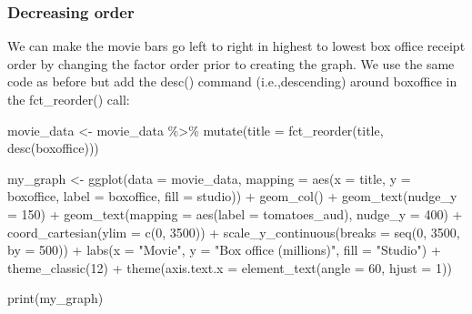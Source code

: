 \documentclass[
]{krantz}
\makeatletter
\newenvironment{Shaded}{\begin{snugshade}}{\end{snugshade}}
\newcommand{\AttributeTok}[1]{\textcolor[rgb]{0.61,0.61,0.61}{#1}}
\newcommand{\DecValTok}[1]{\textcolor[rgb]{0.06,0.06,0.06}{#1}}
\newcommand{\FunctionTok}[1]{\textcolor[rgb]{0,0,0}{#1}}
\newcommand{\NormalTok}[1]{#1}
\newcommand{\OtherTok}[1]{\textcolor[rgb]{0.37,0.37,0.37}{#1}}
\newcommand{\SpecialCharTok}[1]{\textcolor[rgb]{0,0,0}{#1}}
\newcommand{\StringTok}[1]{\textcolor[rgb]{0.5,0.5,0.5}{#1}}
\newenvironment{kframe}{%
\medskip{}
\setlength{\fboxsep}{.8em}
 \def\at@end@of@kframe{}%
 \ifinner\ifhmode%
  \def\at@end@of@kframe{\end{minipage}}%
  \begin{minipage}{\columnwidth}%
 \fi\fi%
 \def\FrameCommand##1{\hskip\@totalleftmargin \hskip-\fboxsep
 \colorbox{shadecolor}{##1}\hskip-\fboxsep
     \hskip-\linewidth \hskip-\@totalleftmargin \hskip\columnwidth}%
 \MakeFramed {\advance\hsize-\width
   \@totalleftmargin\z@ \linewidth\hsize
   \@setminipage}}%
 {\par\unskip\endMakeFramed%
 \at@end@of@kframe}
\renewenvironment{Shaded}{\begin{kframe}}{\end{kframe}}
\makeatother
\begin{document}
\hypertarget{decreasing-order}{%
\subsubsection{Decreasing order}\label{decreasing-order}}

We can make the movie bars go left to right in highest to lowest box office receipt order by changing the factor order prior to creating the graph. We use the same code as before but add the desc() command (i.e.,descending) around boxoffice in the fct\_reorder() call:

\begin{Shaded}
\begin{Highlighting}[]
\NormalTok{movie\_data }\OtherTok{\textless{}{-}}\NormalTok{ movie\_data }\SpecialCharTok{\%\textgreater{}\%} \FunctionTok{mutate}\NormalTok{(}\AttributeTok{title =} \FunctionTok{fct\_reorder}\NormalTok{(title,}
                                  \FunctionTok{desc}\NormalTok{(boxoffice)))}
\end{Highlighting}
\end{Shaded}

\begin{Shaded}
\begin{Highlighting}[]
\NormalTok{my\_graph }\OtherTok{\textless{}{-}} \FunctionTok{ggplot}\NormalTok{(}\AttributeTok{data =}\NormalTok{ movie\_data,}
           \AttributeTok{mapping =} \FunctionTok{aes}\NormalTok{(}\AttributeTok{x =}\NormalTok{ title,}
                         \AttributeTok{y =}\NormalTok{ boxoffice,}
                         \AttributeTok{label =}\NormalTok{ boxoffice, }
                         \AttributeTok{fill =}\NormalTok{ studio)) }\SpecialCharTok{+}
  \FunctionTok{geom\_col}\NormalTok{() }\SpecialCharTok{+}
  \FunctionTok{geom\_text}\NormalTok{(}\AttributeTok{nudge\_y =} \DecValTok{150}\NormalTok{)  }\SpecialCharTok{+}
  \FunctionTok{geom\_text}\NormalTok{(}\AttributeTok{mapping =} \FunctionTok{aes}\NormalTok{(}\AttributeTok{label =}\NormalTok{ tomatoes\_aud), }
            \AttributeTok{nudge\_y =} \DecValTok{400}\NormalTok{) }\SpecialCharTok{+}
  \FunctionTok{coord\_cartesian}\NormalTok{(}\AttributeTok{ylim =} \FunctionTok{c}\NormalTok{(}\DecValTok{0}\NormalTok{, }\DecValTok{3500}\NormalTok{)) }\SpecialCharTok{+}
  \FunctionTok{scale\_y\_continuous}\NormalTok{(}\AttributeTok{breaks =} \FunctionTok{seq}\NormalTok{(}\DecValTok{0}\NormalTok{, }\DecValTok{3500}\NormalTok{, }\AttributeTok{by =} \DecValTok{500}\NormalTok{)) }\SpecialCharTok{+}
  \FunctionTok{labs}\NormalTok{(}\AttributeTok{x =} \StringTok{"Movie"}\NormalTok{,}
       \AttributeTok{y =} \StringTok{"Box office (millions)"}\NormalTok{,}
       \AttributeTok{fill =} \StringTok{"Studio"}\NormalTok{) }\SpecialCharTok{+}
  \FunctionTok{theme\_classic}\NormalTok{(}\DecValTok{12}\NormalTok{) }\SpecialCharTok{+}
  \FunctionTok{theme}\NormalTok{(}\AttributeTok{axis.text.x =} \FunctionTok{element\_text}\NormalTok{(}\AttributeTok{angle =} \DecValTok{60}\NormalTok{, }
                                   \AttributeTok{hjust =} \DecValTok{1}\NormalTok{))  }

\FunctionTok{print}\NormalTok{(my\_graph)}
\end{Highlighting}
\end{Shaded}
\end{document}
